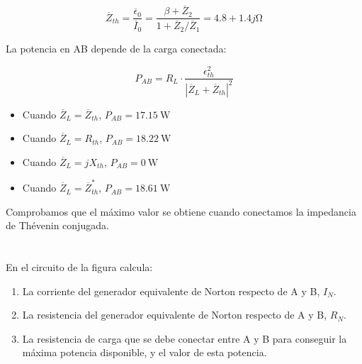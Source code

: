 \documentclass[12pt]{article}
\begin{document}
\begin{equation*}
  \overline{Z}_{th} = \frac{\overline{\epsilon}_0}{\overline{I}_0} = \frac{\beta + \overline{Z}_2}{1 + \overline{Z}_2/\overline{Z}_1} = 4.8 + 1.4j\si{\ohm}
\end{equation*}

La potencia en AB depende de la carga conectada:

\begin{equation*}
  P_{AB} = R_L \cdot \frac{\epsilon_{th}^2}{|\overline{Z}_L + \overline{Z}_{th}|^2}
\end{equation*}

\begin{itemize}
\item Cuando $\overline{Z}_L = \overline{Z}_{th}$, $P_{AB} = \SI{17.15}{\watt}$
\item Cuando $\overline{Z}_L = R_{th}$, $P_{AB} = \SI{18.22}{\watt}$
\item Cuando $\overline{Z}_L = jX_{th}$, $P_{AB} = \SI{0}{\watt}$
\item Cuando $\overline{Z}_L = \overline{Z}^*_{th}$, $P_{AB} = \SI{18.61}{\watt}$
\end{itemize}

Comprobamos que el máximo valor se obtiene cuando conectamos la impedancia de Thévenin conjugada.

\clearpage

\section{}

En el circuito de la figura calcula:

\begin{enumerate}
\item La corriente del generador equivalente de Norton respecto de A y B, $I_N$.
\item La resistencia del generador equivalente de Norton respecto de A y B, $R_N$.
\item La resistencia de carga que se debe conectar entre A y B para conseguir la máxima potencia disponible, y el valor de esta potencia.
\end{enumerate}
\end{document}
